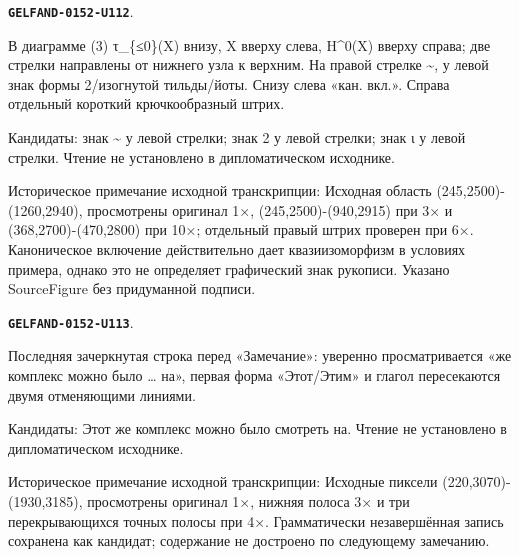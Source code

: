 \documentclass[11pt]{article}
\theoremstyle{definition}
\theoremstyle{remark}
\begin{document}
\par\noindent\leavevmode{}\label{GELFAND-0152-U112}\label{GELFAND-P001396:truncation-diagram:note}\textbf{\texttt{GELFAND-0152-U112}}.\nopagebreak[4]\par
В диаграмме (3) τ\_\{≤0\}(X) внизу, X вверху слева, H\textasciicircum{}0(X) вверху справа; две стрелки направлены от нижнего узла к верхним. На правой стрелке \textasciitilde{}, у левой знак формы 2/изогнутой тильды/йоты. Снизу слева «кан. вкл.». Справа отдельный короткий крючкообразный штрих.\par
Кандидаты: знак \textasciitilde{} у левой стрелки; знак 2 у левой стрелки; знак ι у левой стрелки. Чтение не установлено в дипломатическом исходнике.\par
Историческое примечание исходной транскрипции: Исходная область (245,2500)-(1260,2940), просмотрены оригинал 1×, (245,2500)-(940,2915) при 3× и (368,2700)-(470,2800) при 10×; отдельный правый штрих проверен при 6×. Каноническое включение действительно дает квазиизоморфизм в условиях примера, однако это не определяет графический знак рукописи. Указано SourceFigure без придуманной подписи.\par\medskip
\par\noindent\leavevmode{}\label{GELFAND-0152-U113}\label{GELFAND-P001396:cancelled-bottom-sentence:note}\textbf{\texttt{GELFAND-0152-U113}}.\nopagebreak[4]\par
Последняя зачеркнутая строка перед «Замечание»: уверенно просматривается «же комплекс можно было … на», первая форма «Этот/Этим» и глагол пересекаются двумя отменяющими линиями.\par
Кандидаты: Этот же комплекс можно было смотреть на. Чтение не установлено в дипломатическом исходнике.\par
Историческое примечание исходной транскрипции: Исходные пиксели (220,3070)-(1930,3185), просмотрены оригинал 1×, нижняя полоса 3× и три перекрывающихся точных полосы при 4×. Грамматически незавершённая запись сохранена как кандидат; содержание не достроено по следующему замечанию.\par\medskip
\end{document}
